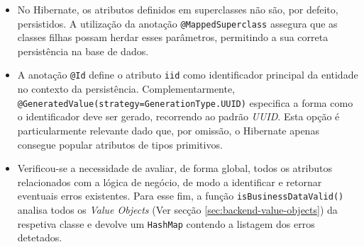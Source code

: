 \begin{itemize}
    \item No \gls{Hibernate}, os atributos definidos em superclasses não são, por defeito, persistidos. A utilização da anotação \lstinline|@MappedSuperclass| assegura que as classes filhas possam herdar esses parâmetros, permitindo a sua correta persistência na base de dados.

    \item A anotação \lstinline|@Id| define o atributo \lstinline|iid| como identificador principal da entidade no contexto da persistência. Complementarmente, \lstinline|@GeneratedValue(strategy=GenerationType.UUID)| especifica a forma como o identificador deve ser gerado, recorrendo ao padrão \textit{UUID}. Esta opção é particularmente relevante dado que, por omissão, o \gls{Hibernate} apenas consegue popular atributos de tipos primitivos.
    
    \item Verificou-se a necessidade de avaliar, de forma global, todos os atributos relacionados com a lógica de negócio, de modo a identificar e retornar eventuais erros existentes. Para esse fim, a função \lstinline|isBusinessDataValid()| analisa todos os \textit{Value Objects} (Ver secção \ref{sec:backend-value-objects}) da respetiva classe e devolve um \lstinline|HashMap| contendo a listagem dos erros detetados.
\end{itemize}

